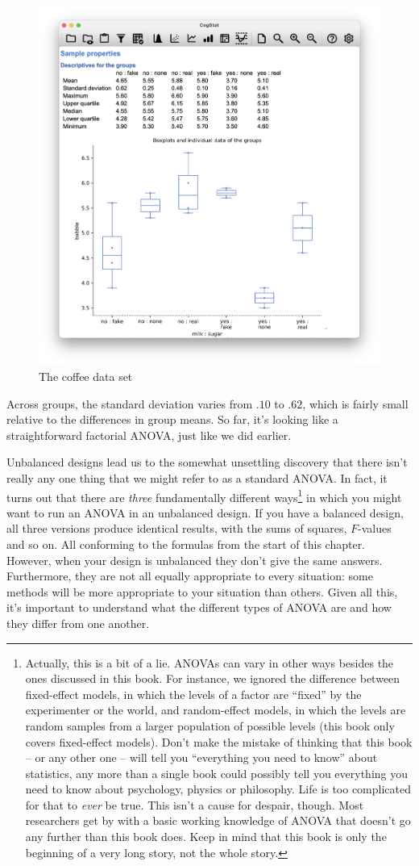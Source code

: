\documentclass[
  11pt,
  a4paper,
  twoside,symmetric,openright]{book}
\theoremstyle{break}
\theoremstyle{break}
\begin{document}
\begin{figure}

{\centering \includegraphics[width=0.6\linewidth]{resources/image/cogstatcoffeedescr} 

}

\caption{The coffee data set}\label{fig:unnamed-chunk-91}
\end{figure}

Across groups, the standard deviation varies from \(.10\) to \(.62\), which is fairly small relative to the differences in group means. So far, it's looking like a straightforward factorial ANOVA, just like we did earlier.

Unbalanced designs lead us to the somewhat unsettling discovery that there isn't really any one thing that we might refer to as a standard ANOVA. In fact, it turns out that there are \emph{three} fundamentally different ways\footnote{Actually, this is a bit of a lie. ANOVAs can vary in other ways besides the ones discussed in this book. For instance, we ignored the difference between fixed-effect models, in which the levels of a factor are ``fixed'' by the experimenter or the world, and random-effect models, in which the levels are random samples from a larger population of possible levels (this book only covers fixed-effect models). Don't make the mistake of thinking that this book -- or any other one -- will tell you ``everything you need to know'' about statistics, any more than a single book could possibly tell you everything you need to know about psychology, physics or philosophy. Life is too complicated for that to \emph{ever} be true. This isn't a cause for despair, though. Most researchers get by with a basic working knowledge of ANOVA that doesn't go any further than this book does. Keep in mind that this book is only the beginning of a very long story, not the whole story.} in which you might want to run an ANOVA in an unbalanced design. If you have a balanced design, all three versions produce identical results, with the sums of squares, \(F\)-values and so on. All conforming to the formulas from the start of this chapter. However, when your design is unbalanced they don't give the same answers. Furthermore, they are not all equally appropriate to every situation: some methods will be more appropriate to your situation than others. Given all this, it's important to understand what the different types of ANOVA are and how they differ from one another.
\end{document}
